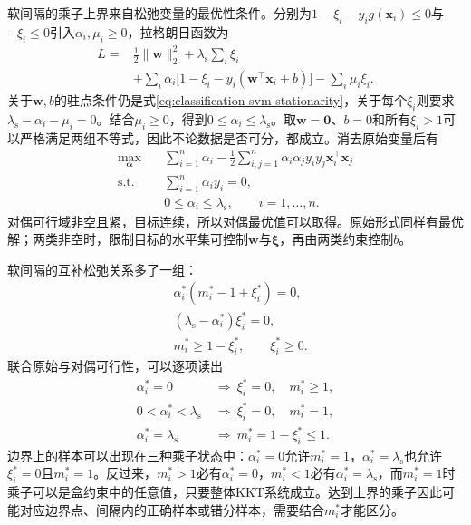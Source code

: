 软间隔的乘子上界来自松弛变量的最优性条件。分别为$1-\xi_i-y_i g(\bm{x}_i)\le0$与$-\xi_i\le0$引入$\alpha_i,\mu_i\ge0$，拉格朗日函数为
\[
  \begin{aligned}
    L={}&\frac12\lVert\bm{w}\rVert_2^2
       +\lambda_{\mathrm{s}}\sum_i\xi_i\\
      &+\sum_i\alpha_i
        \bigl[1-\xi_i-y_i(\bm{w}^{\top}\bm{x}_i+b)\bigr]
       -\sum_i\mu_i\xi_i.
  \end{aligned}
\]
关于$\bm{w},b$的驻点条件仍是式\eqref{eq:classification-svm-stationarity}，关于每个$\xi_i$则要求$\lambda_{\mathrm{s}}-\alpha_i-\mu_i=0$。结合$\mu_i\ge0$，得到$0\le\alpha_i\le\lambda_{\mathrm{s}}$。取$\bm{w}=\bm{0}$、$b=0$和所有$\xi_i>1$可以严格满足两组不等式，因此不论数据是否可分，都成立。消去原始变量后有
\begin{equation}
  \begin{aligned}
    \max_{\bm{\alpha}}\quad&
      \sum_{i=1}^n\alpha_i
       -\frac12\sum_{i,j=1}^n
         \alpha_i\alpha_j y_i y_j
         \bm{x}_i^{\top}\bm{x}_j\\
    \text{s.t.}\quad&
      \sum_{i=1}^n\alpha_i y_i=0,\\
    &0\le\alpha_i\le\lambda_{\mathrm{s}},
      \qquad i=1,\ldots,n.
  \end{aligned}
  \label{eq:classification-svm-soft-dual}
\end{equation}
对偶可行域非空且紧，目标连续，所以对偶最优值可以取得。原始形式同样有最优解；两类非空时，限制目标的水平集可控制$\bm{w}$与$\bm{\xi}$，再由两类约束控制$b$。

软间隔的互补松弛关系多了一组：
\begin{equation}
  \begin{aligned}
    &\alpha_i^{\ast}(m_i^{\ast}-1+\xi_i^{\ast})=0,\\
    &(\lambda_{\mathrm{s}}-\alpha_i^{\ast})\xi_i^{\ast}=0,\\
    &m_i^{\ast}\ge1-\xi_i^{\ast},\qquad \xi_i^{\ast}\ge0.
  \end{aligned}
  \label{eq:classification-svm-soft-kkt}
\end{equation}
联合原始与对偶可行性，可以逐项读出
\begin{equation}
  \begin{aligned}
    \alpha_i^{\ast}=0
      &\ \Longrightarrow\
        \xi_i^{\ast}=0,\quad m_i^{\ast}\ge1,\\
    0<\alpha_i^{\ast}<\lambda_{\mathrm{s}}
      &\ \Longrightarrow\
        \xi_i^{\ast}=0,\quad m_i^{\ast}=1,\\
    \alpha_i^{\ast}=\lambda_{\mathrm{s}}
      &\ \Longrightarrow\
        m_i^{\ast}=1-\xi_i^{\ast}\le1.
  \end{aligned}
  \label{eq:classification-svm-soft-cases}
\end{equation}
边界上的样本可以出现在三种乘子状态中：$\alpha_i^{\ast}=0$允许$m_i^{\ast}=1$，$\alpha_i^{\ast}=\lambda_{\mathrm{s}}$也允许$\xi_i^{\ast}=0$且$m_i^{\ast}=1$。反过来，$m_i^{\ast}>1$必有$\alpha_i^{\ast}=0$，$m_i^{\ast}<1$必有$\alpha_i^{\ast}=\lambda_{\mathrm{s}}$，而$m_i^{\ast}=1$时乘子可以是盒约束中的任意值，只要整体KKT系统成立。达到上界的乘子因此可能对应边界点、间隔内的正确样本或错分样本，需要结合$m_i^{\ast}$才能区分。

